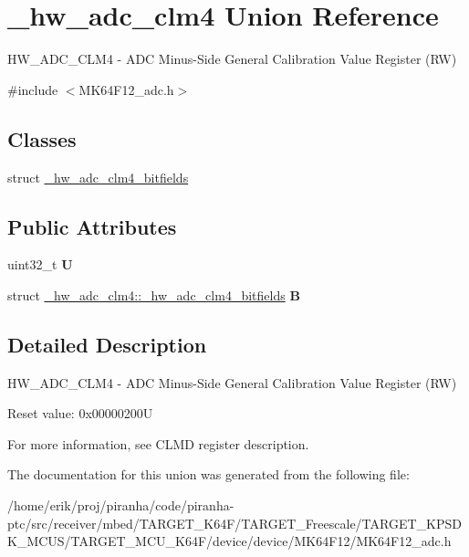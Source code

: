 \hypertarget{union__hw__adc__clm4}{}\section{\+\_\+hw\+\_\+adc\+\_\+clm4 Union Reference}
\label{union__hw__adc__clm4}


H\+W\+\_\+\+A\+D\+C\+\_\+\+C\+L\+M4 -\/ A\+DC Minus-\/\+Side General Calibration Value Register (RW)  




{\ttfamily \#include $<$M\+K64\+F12\+\_\+adc.\+h$>$}

\subsection*{Classes}
\begin{DoxyCompactItemize}
\item 
struct \hyperlink{struct__hw__adc__clm4_1_1__hw__adc__clm4__bitfields}{\+\_\+hw\+\_\+adc\+\_\+clm4\+\_\+bitfields}
\end{DoxyCompactItemize}
\subsection*{Public Attributes}
\begin{DoxyCompactItemize}
\item 
uint32\+\_\+t {\bfseries U}\hypertarget{union__hw__adc__clm4_a8d7f6588f626b22d5f37740be798cd5f}{}\label{union__hw__adc__clm4_a8d7f6588f626b22d5f37740be798cd5f}

\item 
struct \hyperlink{struct__hw__adc__clm4_1_1__hw__adc__clm4__bitfields}{\+\_\+hw\+\_\+adc\+\_\+clm4\+::\+\_\+hw\+\_\+adc\+\_\+clm4\+\_\+bitfields} {\bfseries B}\hypertarget{union__hw__adc__clm4_abb96c1bfc06c5bf60b5c3d49d3d81d7a}{}\label{union__hw__adc__clm4_abb96c1bfc06c5bf60b5c3d49d3d81d7a}

\end{DoxyCompactItemize}


\subsection{Detailed Description}
H\+W\+\_\+\+A\+D\+C\+\_\+\+C\+L\+M4 -\/ A\+DC Minus-\/\+Side General Calibration Value Register (RW) 

Reset value\+: 0x00000200U

For more information, see C\+L\+MD register description. 

The documentation for this union was generated from the following file\+:\begin{DoxyCompactItemize}
\item 
/home/erik/proj/piranha/code/piranha-\/ptc/src/receiver/mbed/\+T\+A\+R\+G\+E\+T\+\_\+\+K64\+F/\+T\+A\+R\+G\+E\+T\+\_\+\+Freescale/\+T\+A\+R\+G\+E\+T\+\_\+\+K\+P\+S\+D\+K\+\_\+\+M\+C\+U\+S/\+T\+A\+R\+G\+E\+T\+\_\+\+M\+C\+U\+\_\+\+K64\+F/device/device/\+M\+K64\+F12/M\+K64\+F12\+\_\+adc.\+h\end{DoxyCompactItemize}
